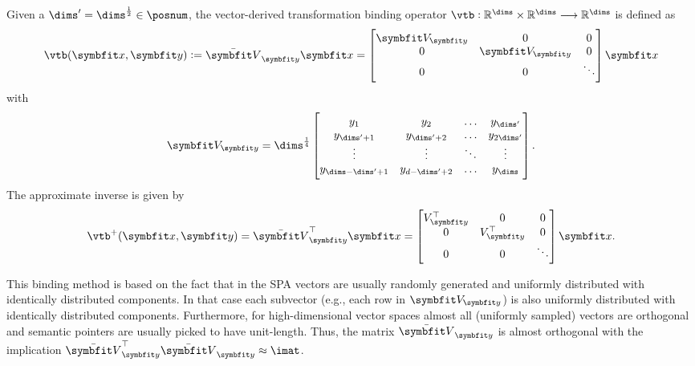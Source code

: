 \begin{defn}
    Given a $\dims' = \dims^{\frac{1}{2}} \in \posnum$, the vector-derived transformation binding operator $\vtb: \mathbb{R}^{\dims} \times \mathbb{R}^{\dims} \longrightarrow \mathbb{R}^{\dims}$ is defined as
    \begin{equation}
        \vtb(\vc x, \vc y) := \bar{\mat V}_{\vc y} \vc x = \begin{bmatrix}
            \mat V_{\vc y} & 0 & 0 \\
            0 & \mat V_{\vc y} & 0 \\
            0 & 0 & \ddots
        \end{bmatrix} \vc x
    \end{equation}
    with
    \begin{equation}
        \mat V_{\vc y} = \dims^{\frac{1}{4}} \begin{bmatrix}
            y_1 & y_2 & \dotso & y_{\dims'} \\
            y_{\dims' + 1} & y_{\dims' + 2} & \dotso & y_{2\dims'} \\
            \vdots & \vdots & \ddots & \vdots \\
            y_{\dims - \dims' + 1} & y_{d - \dims' + 2} & \dotso & y_{\dims}
        \end{bmatrix} \text{.}
    \end{equation}
    The approximate inverse is given by
    \begin{equation}
        \vtb^+(\vc x, \vc y) = \bar{\mat V}_{\vc y}\Tr \vc x = \begin{bmatrix}
            V_{\vc y}\Tr & 0 & 0 \\
            0 & V_{\vc y}\Tr & 0 \\
            0 & 0 & \ddots
        \end{bmatrix} \vc x \text{.}
    \end{equation}
\end{defn}
This binding method is based on the fact that in the SPA vectors are usually randomly generated and uniformly distributed with identically distributed components.
In that case each subvector (e.g., each row in $\mat V_{\vc y}$) is also uniformly distributed with identically distributed components.
Furthermore, for high-dimensional vector spaces almost all (uniformly sampled) vectors are orthogonal and semantic pointers are usually picked to have unit-length.
Thus, the matrix $\bar{\mat V}_{\vc y}$ is almost orthogonal with the implication $\bar{\mat V}_{\vc y}\Tr \bar{\mat V}_{\vc y} \approx \imat$.
